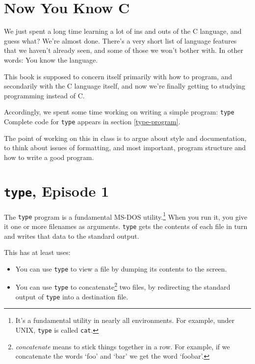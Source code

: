 %
%
%

\section{Now You Know C}

We just spent a long time learning a lot of ins and outs of the C
language, and guess what?  We're almost done.  There's a very short list
of language features that we haven't already seen, and some of those we
won't bother with.  In other words:  You know the language.

This book is supposed to concern itself primarily with how to program,
and secondarily with the C language itself, and now we're finally
getting to studying programming instead of C.

Accordingly, we spent some time working on writing a simple program:
{\tt type} Complete code for {\tt type} appears in section
\ref{type-program}.

The point of working on this in class is to argue about style and
documentation, to think about issues of formatting, and most important,
program structure and how to write a good program.  

\section{{\tt type}, Episode 1}

The {\tt type} program is a fundamental MS-DOS utility.\footnote{It's a
fundamental utility in nearly all environments.  For example, under {\sc
UNIX}, {\tt type} is called {\tt cat}.}  When you run it, you give it
one or more filenames as arguments.  {\tt type} gets the contents of
each file in turn and writes that data to the standard output.  

This has at least uses:

\begin{itemize}
\item You can use {\tt type} to view a file by dumping its contents to
the screen.
\item You can use {\tt type} to concatenate\footnote{{\em concatenate}
means to stick things together in a row.  For example, if we concatenate
the words `foo' and `bar' we get the word `foobar'.} two files, by
redirecting the standard output of {\tt type} into a destination file.
\end{itemize}

